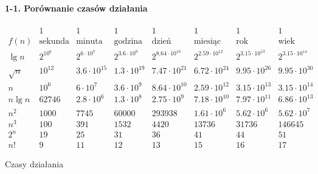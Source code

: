 \paragraph{1-1. Porównanie czasów działania}
\begin{table}[h]
\[
  \begin{array}{c|c|c|c|c|c|c|c}
    &1&1&1&1&1&1&1 \\
	f(n) & \mbox{sekunda} & \mbox{minuta} & \mbox{godzina} & \mbox{dzień} & \mbox{miesiąc} & \mbox{rok} & \mbox{wiek} \\
	\hline
	\lg n & 2^{10^6} & 2^{6\cdot 10^7} & 2^{3.6\cdot 10^9} & 2^{8.64\cdot 10^{10}} & 2^{2.59\cdot 10^{12}} & 2^{3.15\cdot 10^{13}} & 2^{3.15\cdot 10^{14}} \\
	\hline
	\sqrt{n} & 10^{12} & 3.6\cdot 10^{15} & 1.3\cdot 10^{19} & 7.47\cdot 10^{21} & 6.72\cdot 10^{24} & 9.95\cdot 10^{26} & 9.95\cdot 10^{30} \\
	\hline
	n & 10^6 & 6\cdot 10^7 & 3.6\cdot 10^9 & 8.64\cdot 10^{10} & 2.59\cdot 10^{12} & 3.15\cdot 10^{13} & 3.15\cdot 10^{14} \\
	\hline
	n\lg n & 62746 & 2.8\cdot 10^6 & 1.3\cdot 10^8 & 2.75\cdot 10^9 & 7.18\cdot 10^{10} & 7.97\cdot 10^{11} & 6.86\cdot 10^{13} \\
	\hline
	n^2 & 1000 & 7745 & 60000 & 293938 & 1.61\cdot 10^6 & 5.62\cdot 10^6 & 5.62\cdot 10^7 \\
	\hline
	n^3 & 100 & 391 & 1532 & 4420 & 13736 & 31736 & 146645 \\
	\hline
	2^n & 19 & 25 & 31 & 36 & 41 & 44 & 51 \\
	\hline
	n! & 9 & 11 & 12 & 13 & 15 & 16 & 17
  \end{array}
\]
\caption{Czasy działania}
\end{table}
